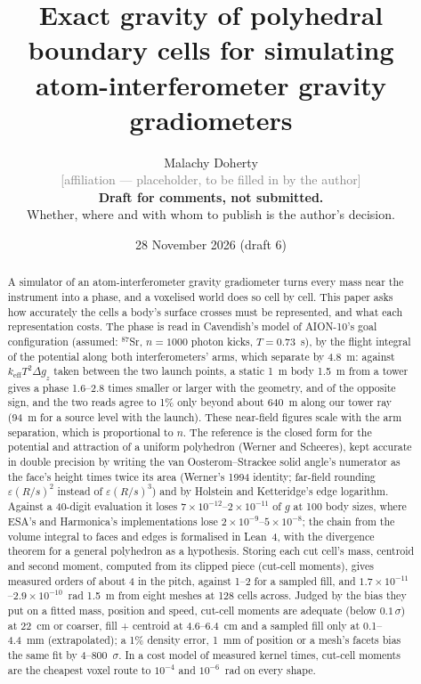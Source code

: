 \documentclass[10pt,a4paper]{article}
\title{Exact gravity of polyhedral boundary cells for simulating\\
atom-interferometer gravity gradiometers}
\author{Malachy Doherty\\
\small\textcolor{gray}{[affiliation --- placeholder, to be filled in by the author]}\\[4pt]
\small\textcolor{red!60!black}{\textbf{Draft for comments, not submitted.}}\\
\small\textcolor{red!60!black}{Whether, where and with whom to publish is the author's decision.}}
\date{28 November 2026 (draft 6)}
\newcommand{\cutcell}{cut-cell moments}
\begin{document}
\maketitle

\begin{abstract}
A simulator of an atom-interferometer gravity gradiometer turns every mass near the instrument into
a phase, and a voxelised world does so cell by cell. This paper asks how accurately the cells a
body's surface crosses must be represented, and what each representation costs. The phase is read in
Cavendish's model of AION-10's goal configuration (assumed: $^{87}$Sr, $n=1000$ photon kicks,
$T=0.73$~s), by the flight integral of the potential along both interferometers' arms, which separate
by 4.8~m: against $k_\mathrm{eff}T^2\Delta g_z$ taken between the two launch points, a static 1~m
body 1.5~m from a tower gives a phase 1.6--2.8 times smaller or larger with the geometry, and of the
opposite sign, and the two reads agree to 1\% only beyond about 640~m along our tower ray (94~m for a
source level with the launch). These near-field figures scale with the arm separation, which is
proportional to $n$. The reference is the closed form for the potential and attraction of a uniform
polyhedron (Werner and Scheeres), kept accurate in double precision by writing the van
Oosterom--Strackee solid angle's numerator as the face's height times twice its area (Werner's 1994
identity; far-field rounding $\varepsilon(R/s)^2$ instead of $\varepsilon(R/s)^3$) and by Holstein
and Ketteridge's edge logarithm. Against a 40-digit evaluation it loses
$7\times10^{-12}$--$2\times10^{-11}$ of $g$ at 100 body sizes, where ESA's and Harmonica's
implementations lose $2\times10^{-9}$--$5\times10^{-8}$; the chain from the volume integral to faces
and edges is formalised in Lean~4, with the divergence theorem for a general polyhedron as a
hypothesis. Storing each cut cell's mass, centroid and second moment, computed from its clipped piece
(\cutcell), gives measured orders of about 4 in the pitch, against 1--2 for a sampled fill, and
$1.7\times10^{-11}$--$2.9\times10^{-10}$~rad 1.5~m from eight meshes at 128 cells across. Judged by
the bias they put on a fitted mass, position and speed, \cutcell{} are adequate (below $0.1\,\sigma$)
at 22~cm or coarser, fill + centroid at 4.6--6.4~cm and a sampled fill only at 0.1--4.4~mm
(extrapolated); a 1\% density error, 1~mm of position or a mesh's facets bias the same fit by
4--800~$\sigma$. In a cost model of measured kernel times, \cutcell{} are the cheapest voxel route to
$10^{-4}$ and $10^{-6}$~rad on every shape.
\end{abstract}
\end{document}

